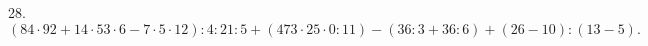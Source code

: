 28. $(84\cdot92+14\cdot53\cdot6-7\cdot5\cdot12):4:21:5+(473\cdot25\cdot0:11)-(36:3+36:6)+(26-10):(13-5).$\\
